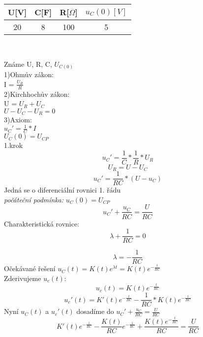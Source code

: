 \documentclass[12pt]{article}
\begin{document}
\begin{center}
\begin{tabular}{| c | c | c | c |}
\hline
U[V] & C[F] & R[$\Omega$] & $u_{C}(0)[V]$ \\
\hline
20 & 8 & 100 & 5\\
\hline
\end{tabular}\\
\end{center}
Známe U, R, C, $U_{C(0)}$\\
1)Ohmův zákon:\\ I = $\frac{U_{R}}{R}$\\
2)Kirchhochův zákon:\\ U = $U_{R}+U_{C}$\\ $U-U_{C}-U_{R}=0$\\
3)Axiom:\\$u_{C}'=\frac{1}{C}*I$\\ $U_{C}(0)=U_{CP}$\\
1.krok\\
\[
  u_{C}'=\displaystyle\frac{1}{C}*\displaystyle\frac{1}{R}*U_{R}
\]
\[
  U_{R} = U-U_{C}
\]
\[
  u_{C}'=\displaystyle\frac{1}{RC}*(U-u_{C})
\]
Jedná se o diferenciální rovnici 1. řádu\\
\textit{počáteční podmínka:} $u_{C}(0)=U_{CP}$\\
\[
  u_{C}'+\displaystyle\frac{u_{C}}{RC}= \displaystyle\frac{U}{RC}
\]
Charakteristická rovnice:
\[
  \lambda + \displaystyle\frac{1}{RC}=0
\]

\[
  \lambda =-\displaystyle\frac{1}{RC}
\]
Očekávané řešení $u_{C}(t)=K(t)e^{\lambda t} = K(t)e^{-\frac{t}{RC}}$\\
Zderivujeme $u_{c}(t)$:
\[
  u_{c}(t) = K(t)e^{-\frac{t}{RC}}
\]
\[
  u_{c}'(t)=K'(t)e^{-\frac{t}{RC}}- \displaystyle\frac{1}{RC}*K(t)e^{-\frac{t}{RC}}
\]
Nyní $u_{C}(t)$ a $u_{c}'(t)$ dosadíme do $u_{C}'+\frac{u_{C}}{RC}=\frac{U}{RC}$
\[
  K'(t)e^{-\frac{1}{RC}}-\displaystyle\frac{K(t)}{RC}e^{-\frac{1}{RC}}+\displaystyle\frac{K(t)e^{-\frac{t}{RC}}}{RC}=\displaystyle\frac{U}{RC}
\]
\end{document}
